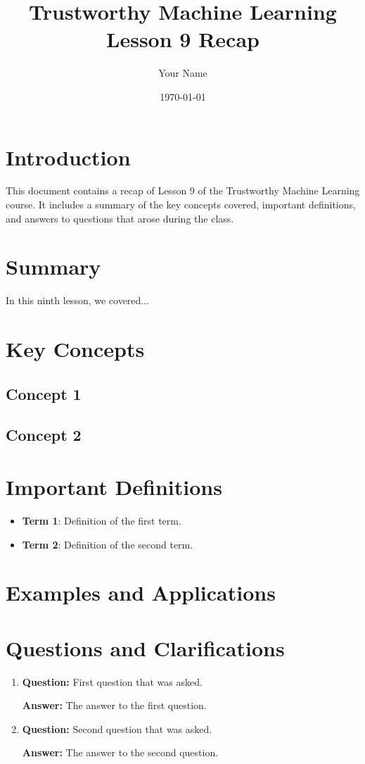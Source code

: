 \documentclass[11pt,a4paper]{article}
\title{Trustworthy Machine Learning\\
\large Lesson 9 Recap}
\author{Your Name}
\date{\today}
\newcommand{\concept}[1]{\textbf{#1}}
\begin{document}
\maketitle
\tableofcontents
\newpage

\section{Introduction}
This document contains a recap of Lesson 9 of the Trustworthy Machine Learning course. It includes a summary of the key concepts covered, important definitions, and answers to questions that arose during the class.

\section{Summary}
In this ninth lesson, we covered...

\section{Key Concepts}
\subsection{Concept 1}

\subsection{Concept 2}

\section{Important Definitions}
\begin{itemize}
    \item \concept{Term 1}: Definition of the first term.
    \item \concept{Term 2}: Definition of the second term.
\end{itemize}

\section{Examples and Applications}

\section{Questions and Clarifications}
\begin{enumerate}
    \item \textbf{Question:} First question that was asked.
    
    \textbf{Answer:} The answer to the first question.
    
    \item \textbf{Question:} Second question that was asked.
    
    \textbf{Answer:} The answer to the second question.
\end{enumerate}
\end{document}
